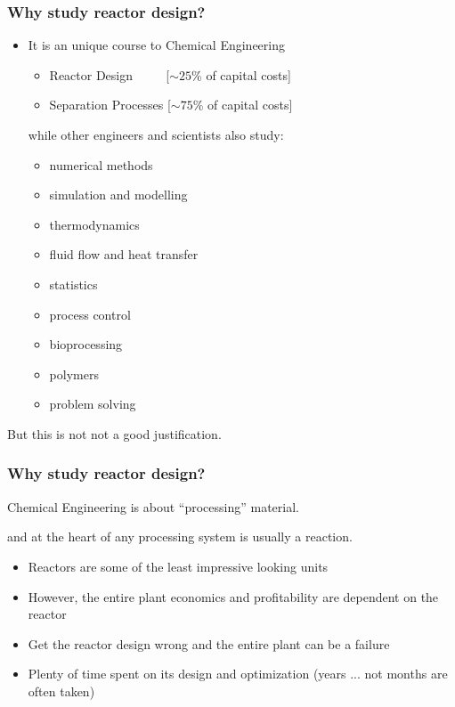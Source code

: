 \begin{frame}\frametitle{Why study reactor design?}
	\begin{itemize}
		\item	It is an unique course to Chemical Engineering
			\begin{itemize}
				\item	Reactor Design $\qquad\,\,$[$\sim 25$\% of capital costs]
				\item	Separation Processes [$\sim 75$\% of capital costs]
			\end{itemize}
			\vspace{12pt}
			while other engineers and scientists also study:
			\begin{itemize}
				\item	numerical methods
				\item	simulation and modelling
				\item	thermodynamics
				\item	fluid flow and heat transfer
				\item	statistics
				\item	process control
				\item	bioprocessing
				\item	polymers
				\item	problem solving
			\end{itemize}
	\end{itemize}
	But this is not not a good justification.
\end{frame}

\begin{frame}\frametitle{Why study reactor design?}
	\begin{exampleblock}{}
		\begin{center}
			Chemical Engineering is about ``processing'' material.
		\end{center}
	\end{exampleblock}
	and at the heart of any processing system is usually a reaction.
	
	\vspace{12pt}
	\begin{itemize}
		\item	Reactors are some of the least impressive looking units
		\item	However, the entire plant economics and profitability are dependent on the reactor
		\item	Get the reactor design wrong and the entire plant can be a failure
		\item	Plenty of time spent on its design and optimization (years ... not months are often taken)
	\end{itemize}	
\end{frame}

